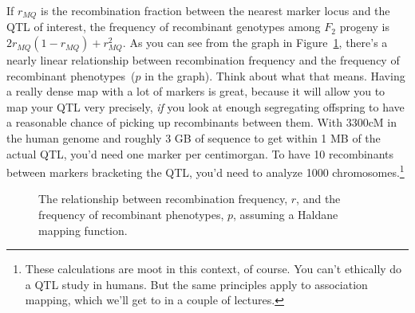 If $r_{MQ}$ is the recombination fraction between the nearest marker
locus and the QTL of interest, the frequency of recombinant genotypes
among $F_2$ progeny is $2r_{MQ}(1-r_{MQ}) + r_{MQ}^2$. As you can see
from the graph in Figure~\ref{fig:recombination}, there's a nearly
linear relationship between recombination frequency and the frequency
of recombinant phenotypes~($p$ in the graph). Think about what that
means. Having a really dense map with a lot of markers is great,
because it will allow you to map your QTL very precisely, {\it if} you
look at enough segregating offspring to have a reasonable chance of
picking up recombinants between them. With 3300cM in the human genome
and roughly 3 GB of sequence to get within 1 MB of the actual QTL,
you'd need one marker per centimorgan. To have 10 recombinants between
markers bracketing the QTL, you'd need to analyze 1000
chromosomes.\footnote{These calculations are moot in this context, of
  course. You can't ethically do a QTL study in humans. But the same
  principles apply to association mapping, which we'll get to in a
  couple of lectures.}

\begin{figure}
\begin{center}
\end{center}
\caption{The relationship between recombination frequency, $r$, and
  the frequency of recombinant phenotypes, $p$, assuming a Haldane
  mapping function.}\label{fig:recombination}
\end{figure}

